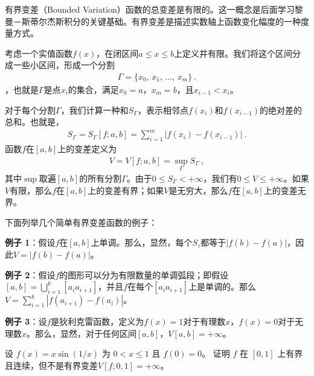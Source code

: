 
有界变差（Bounded Variation）函数的总变差是有限的。这一概念是后面学习黎曼－斯蒂尔杰斯积分的关键基础。有界变差是描述实数轴上函数变化幅度的一种度量方式。

考虑一个实值函数$f(x)$，在闭区间$a\leq x\leq b$上定义并有限。我们将这个区间分成一些小区间，形成一个分割
\begin{align} 
\Gamma=\{x_{0},\,x_{1},\,\ldots,\,x_{m}\} ~.
\end{align}，也就是$\Gamma$是点$x_{i}$的集合，满足$x_{0}=a$，$x_{m}=b$，且$x_{i-1}<x_{i}$。

对于每个分割$\Gamma$，我们计算一种和$S_{\Gamma}$，表示相邻点$f(x_{i})$和$f(x_{i-1})$的绝对差的总和。也就是，
\begin{align} 
S_{\Gamma}=S_{\Gamma}[f;a,b]=\sum_{i=1}^{m}|f(x_{i})-f(x_{i-1})|~.
\end{align}
函数$f$在$[a,b]$上的变差定义为
\begin{align} 
V=V[f;a,b]=\sup_{\Gamma}S_{\Gamma}~, 
\end{align}
其中$\sup$取遍$[a,b]$的所有分割$\Gamma$。由于$0\leq S_{\Gamma}<+\infty$，我们有$0\leq V\leq+\infty$。如果$V$有限，那么$f$在$[a,b]$上的变差有界；如果$V$是无穷大，那么$f$在$[a,b]$上的变差无界。

下面列举几个简单有界变差函数的例子：

\textbf{例子 1}：假设$f$在$[a,b]$上单调。那么，显然，每个$S_{\tau}$都等于$|f(b)-f(a)|$，因此$V=|f(b)-f(a)|$。

\textbf{例子 2}：假设$f$的图形可以分为有限数量的单调弧段；即假设$[a,b]=\bigcup_{i=1}^{k}[a_{i}a_{i+1}]$，并且$f$在每个$[a_{i}a_{i+1}]$上是单调的。那么$V=\sum_{i=1}^{k}|f(a_{i+1})-f(a_{i})|$。

\textbf{例子 3}：设$f$是狄利克雷函数，定义为$f(x)=1$对于有理数$x$，$f(x)=0$对于无理数$x$。那么，显然，对于任何区间$[a,b]$，$V[a,b]=+\infty$。

\begin{example}{设 $f(x)=x\sin\left(1/x\right)$ 为 $0<x\leq1$ 且 $f(0)=0$。 证明 $f$ 在 $[0,1]$ 上有界且连续，但不是有界变差$V[f;0,1]=+\infty$。}

\end{example}

